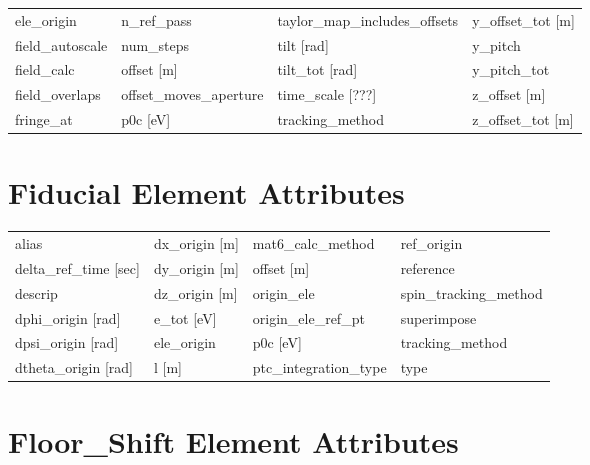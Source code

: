 \begin{tabular}{llll}
ele_origin                     & n_ref_pass                     & taylor_map_includes_offsets    & y_offset_tot [m]               \\
field_autoscale                & num_steps                      & tilt [rad]                     & y_pitch                        \\
field_calc                     & offset [m]                     & tilt_tot [rad]                 & y_pitch_tot                    \\
field_overlaps                 & offset_moves_aperture          & time_scale [???]               & z_offset [m]                   \\
fringe_at                      & p0c [eV]                       & tracking_method                & z_offset_tot [m]               \\
 \bottomrule
 \end{tabular}
 \vfill
 
 \section{Fiducial Element Attributes}
 \label{s:list.fiducial}
 
 \begin{tabular}{llll} \toprule
alias                          & dx_origin [m]                  & mat6_calc_method               & ref_origin                     \\
delta_ref_time [sec]           & dy_origin [m]                  & offset [m]                     & reference                      \\
descrip                        & dz_origin [m]                  & origin_ele                     & spin_tracking_method           \\
dphi_origin [rad]              & e_tot [eV]                     & origin_ele_ref_pt              & superimpose                    \\
dpsi_origin [rad]              & ele_origin                     & p0c [eV]                       & tracking_method                \\
dtheta_origin [rad]            & l [m]                          & ptc_integration_type           & type                           \\
 \bottomrule
 \end{tabular}
 \vfill
 
 \section{Floor_Shift Element Attributes}
 \label{s:list.floor.shift}
 
